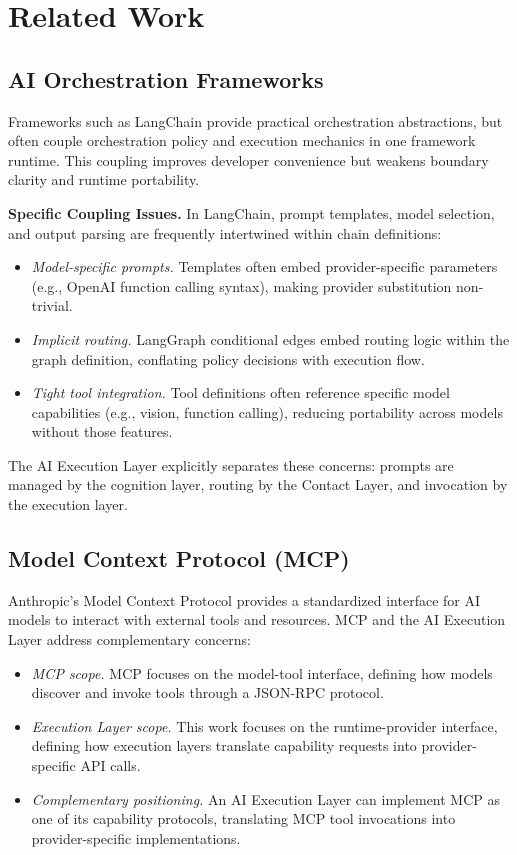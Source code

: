 \section{Related Work}

\subsection{AI Orchestration Frameworks}

Frameworks such as LangChain provide practical orchestration abstractions, but often couple orchestration policy and execution mechanics in one framework runtime. This coupling improves developer convenience but weakens boundary clarity and runtime portability.

\textbf{Specific Coupling Issues.} In LangChain, prompt templates, model selection, and output parsing are frequently intertwined within chain definitions:
\begin{itemize}
    \item \emph{Model-specific prompts.} Templates often embed provider-specific parameters (e.g., OpenAI function calling syntax), making provider substitution non-trivial.
    \item \emph{Implicit routing.} LangGraph conditional edges embed routing logic within the graph definition, conflating policy decisions with execution flow.
    \item \emph{Tight tool integration.} Tool definitions often reference specific model capabilities (e.g., vision, function calling), reducing portability across models without those features.
\end{itemize}

The AI Execution Layer explicitly separates these concerns: prompts are managed by the cognition layer, routing by the Contact Layer, and invocation by the execution layer.

\subsection{Model Context Protocol (MCP)}

Anthropic's Model Context Protocol provides a standardized interface for AI models to interact with external tools and resources. MCP and the AI Execution Layer address complementary concerns:
\begin{itemize}
    \item \emph{MCP scope.} MCP focuses on the model-tool interface, defining how models discover and invoke tools through a JSON-RPC protocol.
    \item \emph{Execution Layer scope.} This work focuses on the runtime-provider interface, defining how execution layers translate capability requests into provider-specific API calls.
    \item \emph{Complementary positioning.} An AI Execution Layer can implement MCP as one of its capability protocols, translating MCP tool invocations into provider-specific implementations.
\end{itemize}

